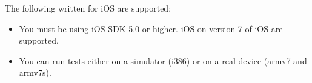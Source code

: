 The following \gdauts{} written for iOS are supported:

\begin{itemize}
\item You must be using iOS SDK 5.0 or higher. iOS \gdauts{} on version 7 of iOS are supported.
\item You can run tests either on a simulator (i386) or on a real device (armv7 and armv7s). 
\end{itemize}



